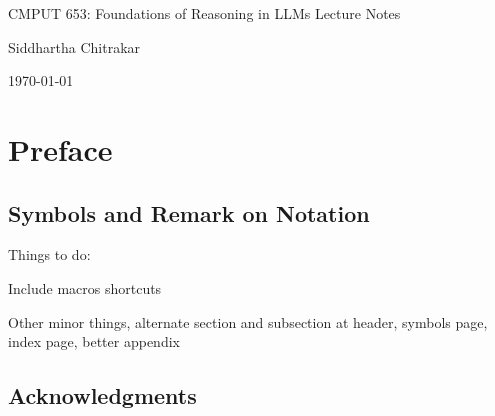 \documentclass[12pt, twoside]{article}
\theoremstyle{spaceddefn}
\begin{document}
\begin{titlepage}
    \centering
    \vspace*{\fill}
    \vspace*{-5cm} %
    {\LARGE CMPUT 653: Foundations of Reasoning \newline in LLMs Lecture Notes\par}
    \vspace{0.6cm}
    {\Large Siddhartha Chitrakar\par}
    \vspace{0.5cm}
    {\large \today\par}
    \vspace*{\fill}
\end{titlepage}

\setcounter{page}{2}

\newpage

\thispagestyle{RemoveHeader}

\tableofcontents
\newpage

\section*{Preface}

\subsection*{Symbols and Remark on Notation}


Things to do:

Include macros shortcuts

Other minor things, alternate section and subsection at header, symbols page, index page, better appendix

\subsection*{Acknowledgments}

\newpage
\end{document}
